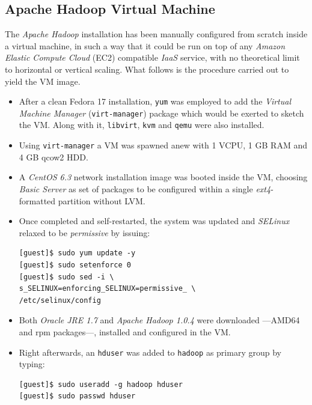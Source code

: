 \documentclass{sig-alternate}
\begin{document}
\subsection{Apache Hadoop Virtual Machine}
The \emph{Apache Hadoop} installation has been manually configured from scratch inside a virtual machine, in such a way that it could be run on top of any \emph{Amazon Elastic Compute Cloud} (EC2) compatible \emph{IaaS} service, with no theoretical limit to horizontal or vertical scaling. What follows is the procedure carried out to yield the VM image.

\begin{itemize}
 \item After a clean Fedora 17 installation, \texttt{yum} was employed to add the \emph{Virtual Machine Manager} (\texttt{virt-manager}) package which would be exerted to sketch the VM. Along with it, \texttt{libvirt}, \texttt{kvm} and \texttt{qemu} were also installed.
 
 \item Using \texttt{virt-manager} a VM was spawned anew with 1 VCPU, 1 GB RAM and 4 GB qcow2 HDD.
 
 \item A \emph{CentOS 6.3} network installation image was booted inside the VM, choosing \emph{Basic Server} as set of packages to be configured within a single \emph{ext4}-formatted partition without LVM.
 
 \item Once completed and self-restarted, the system was updated and \emph{SELinux} relaxed to be \emph{permissive} by issuing:
 
 \begin{verbatim}
[guest]$ sudo yum update -y
[guest]$ sudo setenforce 0
[guest]$ sudo sed -i \
s_SELINUX=enforcing_SELINUX=permissive_ \
/etc/selinux/config
 \end{verbatim}
 
 \item Both \emph{Oracle JRE 1.7} and \emph{Apache Hadoop 1.0.4} were downloaded ---AMD64 and rpm packages---, installed and configured in the VM.
 
 \item Right afterwards, an \texttt{hduser} was added to \texttt{hadoop} as primary group by typing:
 
 \begin{verbatim}
[guest]$ sudo useradd -g hadoop hduser
[guest]$ sudo passwd hduser
 \end{verbatim}


\end{itemize}
\end{document}
